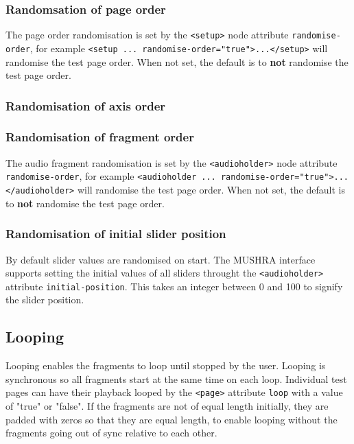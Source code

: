 \documentclass[11pt, oneside]{article}   	%
\begin{document}
		\subsubsection{Randomsation of page order}
        The page order randomisation is set by the \texttt{<setup>} node attribute \texttt{randomise-order}, for example \texttt{<setup ... randomise-order="true">...</setup>} will randomise the test page order. When not set, the default is to \textbf{not} randomise the test page order.

		\subsubsection{Randomisation of axis order}

		\subsubsection{Randomisation of fragment order}
        The audio fragment randomisation is set by the \texttt{<audioholder>} node attribute \texttt{randomise-order}, for example \texttt{<audioholder ... randomise-order="true">...</audioholder>} will randomise the test page order. When not set, the default is to \textbf{not} randomise the test page order.

		\subsubsection{Randomisation of initial slider position}
        By default slider values are randomised on start. The MUSHRA interface supports setting the initial values of all sliders throught the \texttt{<audioholder>} attribute \texttt{initial-position}. This takes an integer between 0 and 100 to signify the slider position.

	\subsection{Looping}
	\label{sec:looping}
	    Looping enables the fragments to loop until stopped by the user. Looping is synchronous so all fragments start at the same time on each loop.
		Individual test pages can have their playback looped by the \texttt{<page>} attribute \texttt{loop} with a value of "true" or "false".
		If the fragments are not of equal length initially, they are padded with zeros so that they are equal length, to enable looping without the fragments going out of sync relative to each other. 
\end{document}
